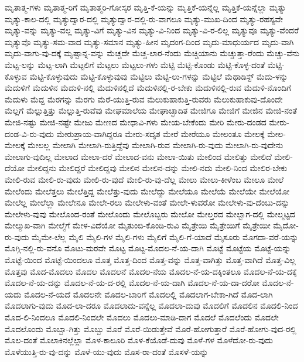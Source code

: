 {ಮೃತಾತ್ಮ-ಗಳು
ಮೃತಾತ್ಮ-ರಿಗೆ
ಮೃತಾತ್ಮರಿ-ಗೋಸ್ಕರ
ಮೃತ್ತಿ-ಕೆ-ಯನ್ನು
ಮೃತ್ತಿಕೆ-ಯನ್ನೆಲ್ಲ
ಮೃತ್ತಿಕೆ-ಯನ್ನೆಲ್ಲಾ
ಮೃತ್ಯು
ಮೃತ್ಯು-ಕಾಲ-ದಲ್ಲಿ
ಮೃತ್ಯುದ್ವಾರ-ದಲ್ಲಿ
ಮೃತ್ಯುದ್ವಾರ-ದಲ್ಲಿ-ರು-ವಾಗಲೂ
ಮೃತ್ಯು-ಮುಖ-ದಿಂದ
ಮೃತ್ಯು-ರಹಸ್ಯವೇ
ಮೃತ್ಯು-ವನ್ನು
ಮೃತ್ಯು-ವಲ್ಲ
ಮೃತ್ಯು-ವಿಗೆ
ಮೃತ್ಯು-ವಿನ
ಮೃತ್ಯು-ವಿ-ನಿಂದ
ಮೃತ್ಯು-ವಿ-ರ-ಲಿಲ್ಲ
ಮೃತ್ಯುವೂ
ಮೃತ್ಯು-ವೆಂದರೆ
ಮೃತ್ಯುವೊ
ಮೃತ್ಯು-ಸಮ-ವಾದ
ಮೃತ್ಯು-ಸಮಾನ
ಮೃತ್ಯು-ಹೀನ
ಮೃದಂಗ-ದಿಂದ
ಮೃದು-ಮಾಧುರ್ಯದ
ಮೃದು-ವಾಗಿ
ಮೃದು-ವಾಗು-ವು-ದಕ್ಕೆ
ಮೃಷ್ಟಾನ್ನ-ವನ್ನು
ಮೆಚ್ಚದೇ
ಮೆಚ್ಚ-ಲಾರ-ನೆಂದು
ಮೆಚ್ಚಿಯಾನು
ಮೆಚ್ಚುತ್ತಾ-ರೆಂದು
ಮೆಚ್ಚು-ವೆನು
ಮೆಟ್ಟ-ಲನ್ನು
ಮೆಟ್ಟ-ಲಾಗಿ
ಮೆಟ್ಟಲಿಗೆ
ಮೆಟ್ಟಲು
ಮೆಟ್ಟಲು-ಗಳು
ಮೆಟ್ಟಿ
ಮೆಟ್ಟಿ-ಕೊಂಡು
ಮೆಟ್ಟಿ-ಕೊಳ್ಳ-ದಂತೆ
ಮೆಟ್ಟಿ-ಕೊಳ್ಳುವ
ಮೆಟ್ಟಿ-ಕೊಳ್ಳುವುದು
ಮೆಟ್ಟಿ-ಕೊಳ್ಳುವುವು
ಮೆಟ್ಟಿಲು
ಮೆಟ್ಟಿ-ಲು-ಗಳನ್ನು
ಮೆಟ್ಟಿಲೆ
ಮೆಥಾಡಿಸ್ಟ್
ಮೆದು-ಳನ್ನು
ಮೆದುಳಿಗೆ
ಮೆದುಳಿನ
ಮೆದುಳಿ-ನಲ್ಲಿ
ಮೆದುಳಿನಲ್ಲಿದೆ
ಮೆದುಳಿನಲ್ಲಿ-ರ-ಬೇಕು
ಮೆದುಳಿನಲ್ಲಿ-ರುವ
ಮೆದುಳಿ-ನೊಂದಿಗೆ
ಮೆದುಳು
ಮೆದ್ದ
ಮೆರಗನ್ನು
ಮೆರಗು
ಮೆರೆ-ಯುತ್ತಿ-ರುವ
ಮೆಲುಕುಹಾಕುತ್ತಿ-ರುವರು
ಮೆಲುಕುಹಾಕುವು-ದೊಂದೇ
ಮೆಲ್ಲಗೆ
ಮೆಲ್ಲುತ್ತಿತ್ತು
ಮೆಲ್ಲುತ್ತಿ-ರುವೆವು
ಮೇಘಮಾಲೆಯ
ಮೇಘಾಚ್ಛಾದಿತ
ಮೇಜಿಗೂ
ಮೇಜಿಗೆ
ಮೇಜಿನ
ಮೇಜಿ-ನಂತೆ
ಮೇಜಿ-ನಷ್ಟು
ಮೇಜಿ-ನಷ್ಟೇ
ಮೇಜು
ಮೇಣದ
ಮೇಧಾವಿ-ಗಳು
ಮೇಯ-ಬೇಕೆಂದು
ಮೇರಿ
ಮೇರು-ದಂಡದ
ಮೇರು-ದಂಡ-ವಿ-ರು-ವುದು
ಮೇರುಪ್ರಾಯ-ವಾಗಿದ್ದರೂ
ಮೇರು-ಸದೃಶ
ಮೇರೆ
ಮೇರೆಯೂ
ಮೇಲಂತೂ
ಮೇಲಕ್ಕೆ
ಮೇಲ-ಮೇಲಕ್ಕೆ
ಮೇಲಲ್ಲ
ಮೇಲಾಗಿ
ಮೇಲಾಗಿ-ರುತ್ತಿದ್ದೆವು
ಮೇಲಾಗಿ-ರುವ
ಮೇಲಾಗಿ-ರು-ವುದು
ಮೇಲಾಗಿ-ರು-ವುದೇನು
ಮೇಲಾಗು-ವುದಿಲ್ಲ
ಮೇಲಾದ
ಮೇಲಾ-ದರೆ
ಮೇಲಾದ-ವನು
ಮೇಲಾ-ಯಿತು
ಮೇಲಿಂದ
ಮೇಲಿತ್ತು
ಮೇಲಿದೆ
ಮೇಲಿ-ದೆಯೋ
ಮೇಲಿದ್ದನು
ಮೇಲಿದ್ದರೆ
ಮೇಲಿದ್ದವು
ಮೇಲಿನ
ಮೇಲಿನ-ದನ್ನು
ಮೇಲಿ-ನದು
ಮೇಲಿ-ನಿಂದ
ಮೇಲಿರ-ಬೇಕು
ಮೇಲಿ-ರುವ
ಮೇಲಿ-ರು-ವುದು
ಮೇಲಿ-ರು-ವುದೆ
ಮೇಲಿ-ರು-ವು-ದೆಲ್ಲ
ಮೇಲು
ಮೇಲು-ಕೀಳೆಂಬ
ಮೇಲೂ
ಮೇಲೆ
ಮೇಲೆಂದು
ಮೇಲೆತ್ತಲು
ಮೇಲೆತ್ತಿದ್ದ
ಮೇಲೆತ್ತು-ವುದು
ಮೇಲೆದ್ದು
ಮೇಲೆಯೂ
ಮೇಲೆಯೆ
ಮೇಲೆಯೇ
ಮೇಲೆಯೋ
ಮೇಲೆಲ್ಲ
ಮೇಲೆಲ್ಲಾ
ಮೇಲೇನೂ
ಮೇಲೇ-ರಲು
ಮೇಲೇಳು-ವಂತೆ
ಮೇಲೇ-ಳುವರೋ
ಮೇಲೇಳು-ವು-ದೆಂಬು-ದನ್ನು
ಮೇಲೇಳು-ವುವು
ಮೇಲೊಂದ-ರಂತೆ
ಮೇಲೊಂದು
ಮೇಲೊಬ್ಬರು
ಮೇಲೋ
ಮೇಲ್ತರದ
ಮೇಲ್ಬಾಗ-ದಲ್ಲಿ
ಮೇಲ್ಮಟ್ಟದ
ಮೇಲ್ಮುಖ-ವಾಗಿ
ಮೇಲ್ಮೆಗೆ
ಮೇಳ-ವಿದೆಯೋ
ಮೈತುಂಬಿ-ಕೊಂಡಿ-ರುವಿ
ಮೈತ್ರೇಯಿ
ಮೈತ್ರೇಯಿಗೆ
ಮೈತ್ರೇಯೀ
ಮೈದೋ-ರು-ವುದು
ಮೈಮೇ-ಲೆಲ್ಲ
ಮೈಲಿ
ಮೈಲಿ-ಗಳ
ಮೈಲಿ-ಗಳು
ಮೈಲಿಗೆ
ಮೈಲಿ-ಗೆ-ಯಾದೆ
ಮೈಸೂರು
ಮೊಗದಾ-ವರೆ-ಯನ್ನು
ಮೊಗ್ಗಿ-ನಲ್ಲಿ-ರು-ವನೊ
ಮೊಟು-ಮರವೇ
ಮೊಟ್ಟ
ಮೊಟ್ಟ-ಮೊದಲ-ನೆ-ಯ-ದಾಗಿ
ಮೊಟ್ಟೆ
ಮೊಟ್ಟೆಯ
ಮೊಟ್ಟೆ-ಯನ್ನು
ಮೊಟ್ಟೆ-ಯಿಂದ
ಮೊಟ್ಟೆ-ಯಿಂದಲೂ
ಮೊತ್ತ
ಮೊತ್ತ-ದಿಂದ
ಮೊತ್ತ-ವನ್ನು
ಮೊತ್ತ-ವಾಗಿತ್ತು
ಮೊತ್ತ-ವಾಗಿದೆ
ಮೊತ್ತ-ವಿಲ್ಲ
ಮೊತ್ತವು
ಮೊದ-ಮೊದಲು
ಮೊದಲ
ಮೊದಲನೆ
ಮೊದಲ-ನೆಯ
ಮೊದಲ-ನೆ-ಯ-ದಕ್ಕಿಂತಲೂ
ಮೊದಲ-ನೆ-ಯ-ದಕ್ಕೆ
ಮೊದಲ-ನೆ-ಯ-ದನ್ನು
ಮೊದಲ-ನೆ-ಯ-ದ-ರಲ್ಲಿ
ಮೊದಲ-ನೆ-ಯ-ದಾಗಿ
ಮೊದಲ-ನೆ-ಯ-ದಾ-ದರೋ
ಮೊದಲ-ನೆ-ಯದು
ಮೊದಲ-ನೆ-ಯದೆ
ಮೊದಲನೇ
ಮೊದಲ-ಬಾರಿಗೆ
ಮೊದಲಲ್ಲಿ
ಮೊದಲಾಗ-ಬೇಕಾ-ಗಿದೆ
ಮೊದ-ಲಾಗಿ
ಮೊದಲಾಗು-ವುದು
ಮೊದ-ಲಾ-ದರೂ
ಮೊದಲಾದು-ವನ್ನೆಲ್ಲ
ಮೊದಲಾ-ದುವು
ಮೊದಲಿಗೆ
ಮೊದಲಿನ
ಮೊದಲಿ-ನಿಂದ
ಮೊದ-ಲಿ-ನಿಂದಲೂ
ಮೊದಲಿ-ನಿಂದಲೇ
ಮೊದಲು
ಮೊದಲು-ಮಾಡಿ-ದಾಗ
ಮೊದಲೆ
ಮೊದಲೆಂದು
ಮೊದಲೇ
ಮೊದಲೊಂದು
ಮೊಬ್ಬಾ-ಗಿತ್ತು
ಮೊಬ್ಬು
ಮೊರೆ
ಮೊರೆ-ಯಿಡುತ್ತೇವೆ
ಮೊರೆ-ಹೋಗುತ್ತಾರೆ
ಮೊರೆ-ಹೋಗು-ವುದ-ರಲ್ಲಿ
ಮೊಲ-ದಂತೆ
ಮೊಲಾಕಿನಲ್ಲೆಲ್ಲಾ
ಮೊಳ-ಕಾಲೂರಿ
ಮೊಳ-ಕೆಯೊಡೆ-ದುವು
ಮೊಳೆ-ಗಳ
ಮೊಳೆದೋ-ರು-ವುದು
ಮೊಳೆಯುತ್ತಿ-ರು-ವು-ದನ್ನು
ಮೊಳೆ-ಯು-ವುದು
ಮೊಸ-ರಾ-ದಂತೆ
ಮೊಸಳೆ-ಯನ್ನು
}
